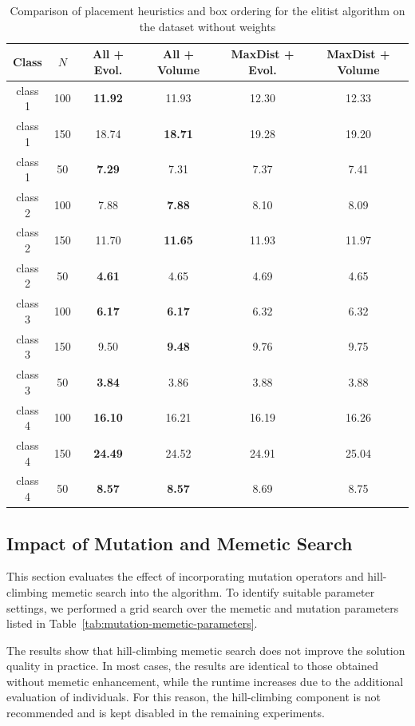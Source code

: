 \begin{table}[htbp]
\centering
\caption{Comparison of placement heuristics and box ordering for the elitist algorithm on the dataset without weights}
\label{tab:combined-results}
\begin{tabular}{|c|c|c|c|c|c|}
\hline
Class & $N$ & All + Evol. & All + Volume & MaxDist + Evol. & MaxDist + Volume \\ \hline
class 1 & 100 & \textbf{11.92} & 11.93 & 12.30 & 12.33 \\ \hline
class 1 & 150 & 18.74 & \textbf{18.71} & 19.28 & 19.20 \\ \hline
class 1 & 50  & \textbf{7.29}  & 7.31  & 7.37  & 7.41  \\ \hline
class 2 & 100 & 7.88  & \textbf{7.88}  & 8.10  & 8.09  \\ \hline
class 2 & 150 & 11.70 & \textbf{11.65} & 11.93 & 11.97 \\ \hline
class 2 & 50  & \textbf{4.61}  & 4.65  & 4.69  & 4.65  \\ \hline
class 3 & 100 & \textbf{6.17}  & \textbf{6.17}  & 6.32  & 6.32  \\ \hline
class 3 & 150 & 9.50  & \textbf{9.48}  & 9.76  & 9.75  \\ \hline
class 3 & 50  & \textbf{3.84}  & 3.86  & 3.88  & 3.88  \\ \hline
class 4 & 100 & \textbf{16.10} & 16.21 & 16.19 & 16.26 \\ \hline
class 4 & 150 & \textbf{24.49} & 24.52 & 24.91 & 25.04 \\ \hline
class 4 & 50  & \textbf{8.57}  & \textbf{8.57}  & 8.69  & 8.75 \\ \hline
\end{tabular}
\end{table}


\subsection{Impact of Mutation and Memetic Search}
This section evaluates the effect of incorporating mutation operators and hill-climbing memetic 
search into the algorithm. To identify suitable parameter settings, we performed a grid search over 
the memetic and mutation parameters listed in Table~\ref{tab:mutation-memetic-parameters}. 

The results show that hill-climbing memetic search does not improve the solution quality in practice. 
In most cases, the results are identical to those obtained without memetic enhancement, 
while the runtime increases due to the additional evaluation of individuals. 
For this reason, the hill-climbing component is not recommended and is kept disabled in the remaining experiments.

